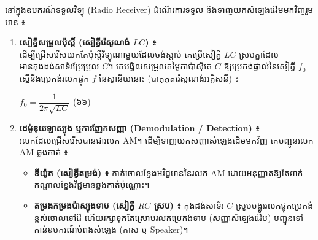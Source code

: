 \noindent
នៅក្នុងឧបករណ៍ទទួលវិទ្យុ ({\englishfont Radio Receiver}) ដំណើរការទទួល និងទាញយកសំឡេងដើមមកវិញរួមមាន ៖
\begin{enumerate}[label=\textbf{\arabic*.} ,itemsep=3pt, topsep=2pt, leftmargin=1.6em]
	\item \textbf{សៀគ្វីសម្រួលប៉ុស្តិ៍ (សៀគ្វីរ៉េសូណង់ $LC$) ៖}\\
	ដើម្បីជ្រើសរើសយកតែប៉ុស្តិ៍វិទ្យុណាមួយដែលចង់ស្ដាប់ គេប្រើសៀគ្វី $LC$ ស្របគ្នាដែលមានកុងដង់សាទ័រប្រែប្រួល $C$។ គេបង្វិលសម្រួលតម្លៃកាប៉ាស៊ីតេ $C$ ឱ្យប្រេកង់ផ្ទាល់នៃសៀគ្វី $f_0$ ស្មើនឹងប្រេកង់រលកផ្ទុក $f$ នៃស្ថានីយនោះ (បាតុភូតរ៉េសូណង់អគ្គិសនី) ៖
	\begin{center}
		$\boxed{f_0 = \dfrac{1}{2\pi \sqrt{L C}}}$ \quad (៦៦)
	\end{center}

	\item \textbf{ដេម៉ូឌុយឡាស្យុង ឬការញែកសញ្ញា ({\englishfont Demodulation / Detection}) ៖}\\
	រលកដែលជ្រើសរើសបានជារលក AM។ ដើម្បីទាញយកសញ្ញាសំឡេងដើមមកវិញ គេបញ្ជូនរលក AM ឆ្លងកាត់ ៖
	\begin{itemize}[itemsep=2pt, topsep=1pt, leftmargin=1.5em]
		\item \textbf{ឌីយ៉ូត (សៀគ្វីតម្រង់) ៖} កាត់ចោលខ្នែងអវិជ្ជមាននៃរលក AM ដោយអនុញ្ញាតឱ្យតែពាក់កណ្តាលខ្នែងវិជ្ជមានឆ្លងកាត់ប៉ុណ្ណោះ។
		\item \textbf{តម្រងកម្រងប៉ាស្យុងទាប (សៀគ្វី $RC$ ស្រប) ៖} កុងដង់សាទ័រ $C$ ស្រូបបង្ហូររលកផ្ទុកប្រេកង់ខ្ពស់ចោលទៅដី ហើយរក្សាទុកតែស្រោមរលកប្រេកង់ទាប (សញ្ញាសំឡេងដើម) បញ្ជូនទៅកាន់ឧបករណ៍បំពងសំឡេង (កាស ឬ Speaker)។
	\end{itemize}
\end{enumerate}

